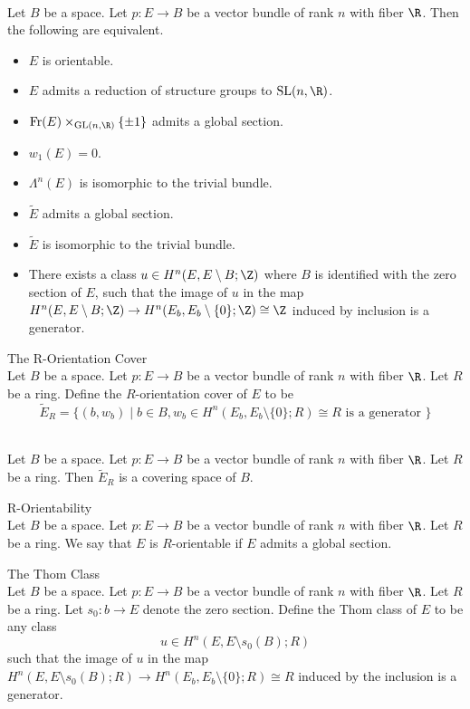 \documentclass[a4paper]{article}
\begin{document}
\begin{prp}{}{}\\
Let $B$ be a space. Let $p:E\to B$ be a vector bundle of rank $n$ with fiber $\R$. Then the following are equivalent. 
\begin{itemize}
\item $E$ is orientable. 
\item $E$ admits a reduction of structure groups to $\text{SL}(n,\R)$. 
\item $\text{Fr}(E)\times_{\text{GL}(n,\R)}\{\pm1\}$ admits a global section. 
\item $w_1(E)=0$. 
\item $\Lambda^n(E)$ is isomorphic to the trivial bundle. 
\item $\widetilde{E}$ admits a global section. 
\item $\widetilde{E}$ is isomorphic to the trivial bundle. 
\item There exists a class $u\in H^n(E,E\setminus B;\Z)$ where $B$ is identified with the zero section of $E$, such that the image of $u$ in the map $H^n(E,E\setminus B;\Z)\to H^n(E_b,E_b\setminus\{0\};\Z)\cong\Z$ induced by inclusion is a generator. 
\end{itemize}
\end{prp}

\begin{defn}{The R-Orientation Cover}{}\\
Let $B$ be a space. Let $p:E\to B$ be a vector bundle of rank $n$ with fiber $\R$. Let $R$ be a ring. Define the $R$-orientation cover of $E$ to be $$\widetilde{E}_R=\{(b,w_b)\;|\;b\in B, w_b\in H^n(E_b,E_b\setminus\{0\};R)\cong R\text{ is a generator }\}$$
\end{defn}

\begin{lmm}{}{}\\
Let $B$ be a space. Let $p:E\to B$ be a vector bundle of rank $n$ with fiber $\R$. Let $R$ be a ring. Then $\widetilde{E}_R$ is a covering space of $B$. 
\end{lmm}

\begin{defn}{R-Orientability}{}\\
Let $B$ be a space. Let $p:E\to B$ be a vector bundle of rank $n$ with fiber $\R$. Let $R$ be a ring. We say that $E$ is $R$-orientable if $E$ admits a global section. 
\end{defn}

\begin{defn}{The Thom Class}{}\\
Let $B$ be a space. Let $p:E\to B$ be a vector bundle of rank $n$ with fiber $\R$. Let $R$ be a ring. Let $s_0:b\to E$ denote the zero section. Define the Thom class of $E$ to be any class $$u\in H^n(E,E\setminus s_0(B);R)$$ such that the image of $u$ in the map $H^n(E,E\setminus s_0(B);R)\to H^n(E_b,E_b\setminus\{0\};R)\cong R$ induced by the inclusion is a generator. 
\end{defn}
\end{document}
